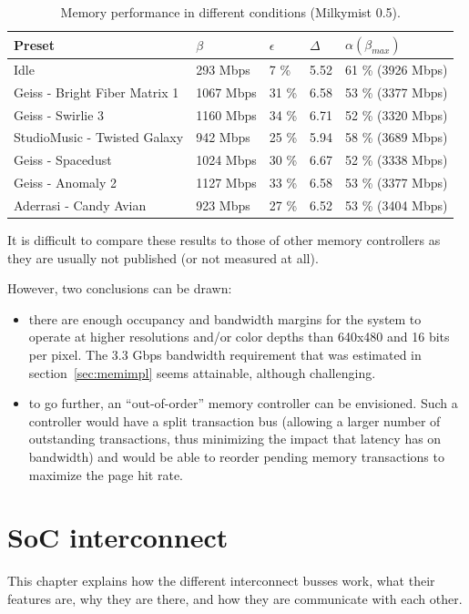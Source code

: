 \documentclass[a4paper,11pt]{kthesis}
\begin{document}
\begin{table}
\centering
\begin{tabular}{|l|l|l|l|l|}
\hline
\textbf{Preset} & $\beta$ & $\epsilon$ & $\Delta$ & $\alpha(\beta_{max})$ \\
\hline
Idle & 293 Mbps & 7 \% & 5.52 & 61 \% (3926 Mbps) \\
\hline
Geiss - Bright Fiber Matrix 1 & 1067 Mbps & 31 \% & 6.58 & 53 \% (3377 Mbps) \\
\hline
Geiss - Swirlie 3 & 1160 Mbps & 34 \% & 6.71 & 52 \% (3320 Mbps) \\
\hline
StudioMusic - Twisted Galaxy & 942 Mbps & 25 \% & 5.94 & 58 \% (3689 Mbps) \\
\hline
Geiss - Spacedust & 1024 Mbps & 30 \% & 6.67 & 52 \% (3338 Mbps) \\
\hline
Geiss - Anomaly 2 & 1127 Mbps & 33 \% & 6.58 & 53 \% (3377 Mbps) \\
\hline
Aderrasi - Candy Avian & 923 Mbps & 27 \% & 6.52 & 53 \% (3404 Mbps) \\
\hline
\end{tabular}
\caption{Memory performance in different conditions (Milkymist 0.5).}\label{tab:memperformance}
\end{table} %

It is difficult to compare these results to those of other memory controllers as they are usually not published (or not measured at all).

However, two conclusions can be drawn:
\begin{itemize}
\item there are enough occupancy and bandwidth margins for the system to operate at higher resolutions and/or color depths than 640x480 and 16 bits per pixel. The 3.3 Gbps bandwidth requirement that was estimated in section~\ref{sec:memimpl} seems attainable, although challenging.
\item to go further, an ``out-of-order'' memory controller can be envisioned. Such a controller would have a split transaction bus (allowing a larger number of outstanding transactions, thus minimizing the impact that latency has on bandwidth) and would be able to reorder pending memory transactions to maximize the page hit rate.
\end{itemize}

\chapter{SoC interconnect}
\label{ch:intercon}
This chapter explains how the different interconnect busses work, what their features are, why they are there, and how they are communicate with each other.
\end{document}
